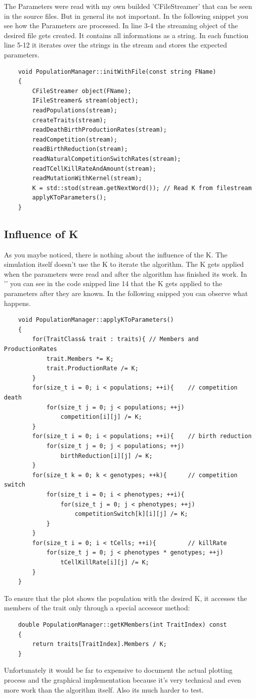 \documentclass[a4paper,10pt]{scrartcl}
\begin{document}
	The Parameters were read with my own builded 'CFileStreamer' that can be seen in the source files. But in general its not important. In the following snippet you see how the Parameters are processed. In line 3-4 the streaming object of the desired file gets created. It contains all informations as a string. In each function line 5-12 it iterates over the strings in the stream and stores the expected parameters.
	\begin{lstlisting}
	void PopulationManager::initWithFile(const string FName)
	{
	    CFileStreamer object(FName);
	    IFileStreamer& stream(object);
	    readPopulations(stream);
	    createTraits(stream);
	    readDeathBirthProductionRates(stream);
	    readCompetition(stream);
	    readBirthReduction(stream);
	    readNaturalCompetitionSwitchRates(stream);
	    readTCellKillRateAndAmount(stream);
	    readMutationWithKernel(stream);
	    K = std::stod(stream.getNextWord()); // Read K from filestream
	    applyKToParameters();
	}
	\end{lstlisting}

	\subsection{Influence of K}
	As you maybe noticed, there is nothing about the influence of the K. The simulation itself doesn't use the K to iterate the algorithm. The K gets applied when the parameters were read and after the algorithm has finished its work. In '' you can see in the code snipped line 14 that the K gets applied to the parameters after they are known. In the following snipped you can observe what happens.
	\begin{lstlisting}
	void PopulationManager::applyKToParameters()
	{
	    for(TraitClass& trait : traits){ // Members and ProductionRates
	        trait.Members *= K;
	        trait.ProductionRate /= K;
	    }
	    for(size_t i = 0; i < populations; ++i){    // competition death
	        for(size_t j = 0; j < populations; ++j)
	            competition[i][j] /= K;
	    }
	    for(size_t i = 0; i < populations; ++i){    // birth reduction
	        for(size_t j = 0; j < populations; ++j)
	            birthReduction[i][j] /= K;
	    }
	    for(size_t k = 0; k < genotypes; ++k){      // competition switch
	        for(size_t i = 0; i < phenotypes; ++i){
	            for(size_t j = 0; j < phenotypes; ++j)
	                competitionSwitch[k][i][j] /= K;
	        }
	    }
	    for(size_t i = 0; i < tCells; ++i){         // killRate
	        for(size_t j = 0; j < phenotypes * genotypes; ++j)
	            tCellKillRate[i][j] /= K;
	    }
	}
	\end{lstlisting}	
	To ensure that the plot shows the population with the desired K, it accesses the members of the trait only through a special accessor method:
	\begin{lstlisting}
	double PopulationManager::getKMembers(int TraitIndex) const
	{
	    return traits[TraitIndex].Members / K;
	}
	\end{lstlisting}
	Unfortunately it would be far to expensive to document the actual plotting process and the graphical implementation because it's very technical and even more work than the algorithm itself. Also its much harder to test.
	
\end{document}
